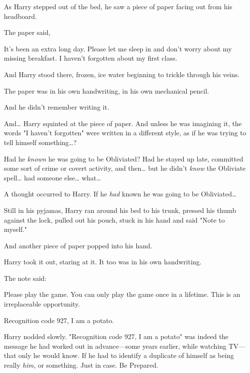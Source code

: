 As Harry stepped out of the bed, he saw a piece of paper facing out from his
headboard.

The paper said,

\begin{writtenNote}

It's been an extra long day. Please let me sleep in and don't worry about
my missing breakfast. I haven't forgotten about my first class.

\end{writtenNote}

And Harry stood there, frozen, ice water beginning to trickle through his veins.

The paper was in his own handwriting, in his own mechanical pencil.

And he didn't remember writing it.

And{\ldots} Harry squinted at the piece of paper. And unless he was imagining
it, the words "I haven't forgotten" were written in a different style, as if he
was trying to tell himself something{\ldots}?

Had he \emph{known} he was going to be Obliviated? Had he stayed up late,
committed some sort of crime or covert activity, and then{\ldots} but he didn't
\emph{know} the Obliviate spell{\ldots} had someone else{\ldots} what{\ldots}

A thought occurred to Harry. If he \emph{had} known he was going to be
Obliviated{\ldots}

Still in his pyjamas, Harry ran around his bed to his trunk, pressed his thumb
against the lock, pulled out his pouch, stuck in his hand and said "Note to
myself."

And another piece of paper popped into his hand.

Harry took it out, staring at it. It too was in his own handwriting.

The note said:

\begin{writtenNote}

Please play the game. You can only play the game once in a lifetime. This
is an irreplaceable opportunity.

Recognition code 927, I am a potato.

\end{writtenNote}

Harry nodded slowly. "Recognition code 927, I am a potato" was indeed the
message he had worked out in advance---some years earlier, while watching
TV---that only he would know. If he had to identify a duplicate of himself as
being really \emph{him,} or something. Just in case. Be Prepared.

